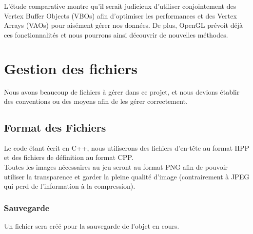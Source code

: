 \documentclass[a4paper]{memoir}
\begin{document}
				L'étude comparative montre qu'il serait judicieux d'utiliser conjointement des Vertex Buffer Objects (VBOs) afin d'optimiser les performances et des Vertex Arrays (VAOs) pour aisément gérer nos données. De plus, OpenGL prévoit déjà ces fonctionnalités et nous pourrons ainsi découvrir de nouvelles méthodes.
			
		\section{Gestion des fichiers}
			Nous avons beaucoup de fichiers à gérer dans ce projet, et nous devions établir des conventions ou des moyens afin de les gérer correctement.
			
			\subsection{Format des Fichiers}
				Le code étant écrit en C++, nous utiliserons des fichiers d'en-tête au format HPP et des fichiers de définition au format CPP.\\
				Toutes les images nécessaires au jeu seront au format PNG afin de pouvoir utiliser la transparence et garder la pleine qualité d'image (contrairement à JPEG qui perd de l'information à la compression).\\
			
				\subsubsection{Sauvegarde}
					Un fichier sera créé pour la sauvegarde de l'objet en cours.\\
			
\end{document}
